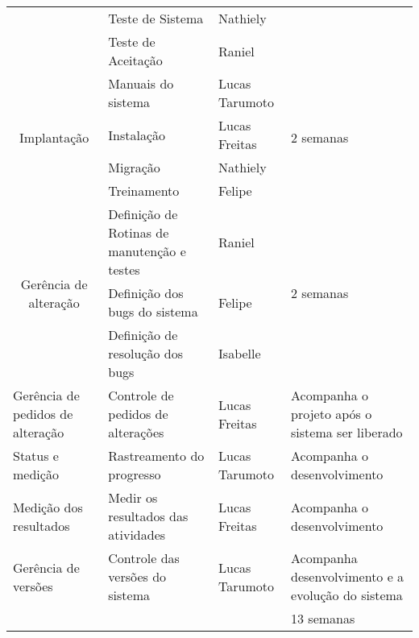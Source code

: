 \begin{longtable}[c]{|p{2em}|p{15em}|p{3em}|p{4em}|}
\cmidrule{2-3}         & \multicolumn{1}{p{10.055em}|}{Teste de Sistema} & \multicolumn{1}{p{5.89em}|}{Nathiely} & \multicolumn{1}{c|}{} \\
\cmidrule{2-3}         & \multicolumn{1}{p{10.055em}|}{Teste de Aceitação} & \multicolumn{1}{p{5.89em}|}{Raniel} & \multicolumn{1}{c|}{} \\
    \midrule
    \multicolumn{1}{|c|}{\multirow{4}[8]{*}{Implantação}} & \multicolumn{1}{p{10.055em}|}{Manuais do sistema} & \multicolumn{1}{p{5.89em}|}{Lucas Tarumoto} & \multirow{4}[8]{*}{2 semanas} \\
\cmidrule{2-3}         & \multicolumn{1}{p{10.055em}|}{Instalação} & \multicolumn{1}{p{5.89em}|}{Lucas Freitas} & \multicolumn{1}{c|}{} \\
\cmidrule{2-3}         & \multicolumn{1}{p{10.055em}|}{Migração} & \multicolumn{1}{p{5.89em}|}{Nathiely} & \multicolumn{1}{c|}{} \\
\cmidrule{2-3}         & \multicolumn{1}{p{10.055em}|}{Treinamento} & \multicolumn{1}{p{5.89em}|}{Felipe} & \multicolumn{1}{c|}{} \\
    \midrule
    \multicolumn{1}{|c|}{\multirow{3}[6]{*}{Gerência de alteração}} & \multicolumn{1}{p{10.055em}|}{Definição de Rotinas de manutenção e testes} & \multicolumn{1}{p{5.89em}|}{Raniel} & \multirow{3}[6]{*}{2 semanas} \\
\cmidrule{2-3}         & \multicolumn{1}{p{10.055em}|}{Definição dos bugs do sistema} & \multicolumn{1}{p{5.89em}|}{Felipe} & \multicolumn{1}{c|}{} \\
\cmidrule{2-3}         & \multicolumn{1}{p{10.055em}|}{Definição de resolução dos bugs} & \multicolumn{1}{p{5.89em}|}{Isabelle} & \multicolumn{1}{c|}{} \\
    \midrule
    \multicolumn{1}{|p{9.11em}|}{Gerência de pedidos de alteração} & \multicolumn{1}{p{10.055em}|}{Controle de pedidos de alterações} & \multicolumn{1}{p{5.89em}|}{Lucas Freitas} & Acompanha o projeto após o sistema ser liberado \\
    \midrule
    \multicolumn{1}{|p{9.11em}|}{Status e medição} & \multicolumn{1}{p{10.055em}|}{Rastreamento do progresso} & \multicolumn{1}{p{5.89em}|}{Lucas Tarumoto} & Acompanha o desenvolvimento \\
    \midrule
    \multicolumn{1}{|p{9.11em}|}{Medição dos resultados} & \multicolumn{1}{p{10.055em}|}{Medir os resultados das atividades} & \multicolumn{1}{p{5.89em}|}{Lucas Freitas} & Acompanha o desenvolvimento \\
    \midrule
    \multicolumn{1}{|p{9.11em}|}{Gerência de versões} & \multicolumn{1}{p{10.055em}|}{Controle das versões do sistema} & \multicolumn{1}{p{5.89em}|}{Lucas Tarumoto} & Acompanha desenvolvimento e a evolução do sistema \\
    \midrule
         &      &      & 13 semanas \\
    \bottomrule

 
\end{longtable}%
